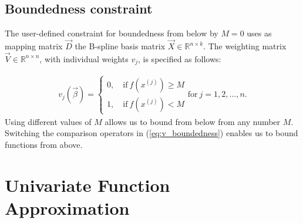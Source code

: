 \documentclass[10pt,a4paper]{report}
\begin{document}
\subsection{Boundedness constraint} \label{subsec:BoudC}

The user-defined constraint for boundedness from below by $M=0$ uses as mapping matrix $\vec{D}$ the B-spline basis matrix $\vec{X} \in \mathbb{R}^{n \times k}$. The weighting matrix $\vec{V} \in \mathbb{R}^{n\times n}$, with individual weights $v_j$, is specified as follows:

\begin{align} \label{eq:v_boundedness}
	v_j(\vec{\beta}) = \begin{cases} 
		0, \quad \text{if} \ f(x^{(j)}) \ge M\\ 
		1, \quad \text{if} \ f(x^{(j)})  < M 		
	\end{cases} \text{for} \ j=1,2,\dots,n.
\end{align}
%
Using different values of $M$ allows us to bound from below from any number $M$. Switching the comparison operators in (\ref{eq:v_boundedness}) enables us to bound functions from above. 




\section{Univariate Function Approximation}
	
\end{document}
